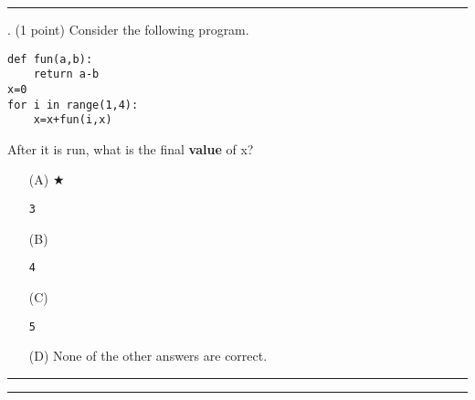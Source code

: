 \documentclass{article}
\begin{document}
\vspace{2em}
\hrule height 2pt


\newpage
{}. (1 point)
Consider the following program.
\begin{verbatim}
def fun(a,b):
    return a-b
x=0
for i in range(1,4):
    x=x+fun(i,x)
\end{verbatim}
After it is run, what is the final \textbf{value} of x?


\begin{enumerate}
\item[(A)] $\bigstar$ 
\begin{verbatim}3\end{verbatim}

\item[(B)]
\begin{verbatim}4\end{verbatim}

\item[(C)]
\begin{verbatim}5\end{verbatim}

\item[(D)]
None of the other answers are correct.

\end{enumerate}

\vspace*{2em}
\hrule
\vspace{2em}

\vspace{2em}
\hrule height 2pt
\end{document}
